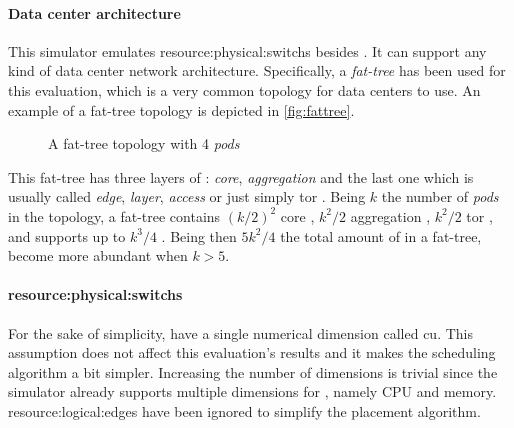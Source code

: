 \paragraph{Data center architecture} \label{dc_architecture}
This simulator emulates \glspl{resource:physical:switch} besides .
It can support any kind of data center network architecture.
Specifically, a \textit{fat-tree} has been used for this evaluation, which is a very common topology for data centers to use. An example of a fat-tree topology is depicted in \autoref{fig:fattree}.
\begin{figure}[!htb]
    \centering
    \usebox{\fattree}
    \caption{A fat-tree topology with 4 \textit{pods}}
    \label{fig:fattree}
\end{figure}

This fat-tree has three layers of : \textit{core}, \textit{aggregation} and the last one which is usually called \textit{edge}, \textit{layer}, \textit{access} or just simply \gls{tor} .
Being $k$ the number of \textit{pods} in the topology, a fat-tree contains $(k/2)^2$ core , $k^2/2$ aggregation , $k^2/2$ \gls{tor} , and supports up to $k^3/4$ .
Being then $5k^2/4$ the total amount of  in a fat-tree,  become more abundant when $k>5$.

\paragraph{\Glspl{resource:physical:switch}} \label{simulator_switch_resources}
For the sake of simplicity,  have a single numerical dimension called \gls{cu}.
This assumption does not affect this evaluation's results and it makes the scheduling algorithm a bit simpler.
Increasing the number of  dimensions is trivial since the simulator already supports multiple dimensions for , namely CPU and memory.
\Glspl{resource:logical:edge} have been ignored to simplify the placement algorithm.


